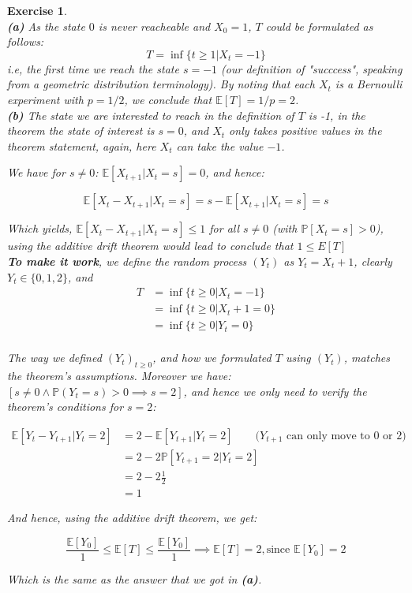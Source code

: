\documentclass{article}
\newtheorem{exo}{Exercise}
\def\P{\mathbb{P}}
\def\E{\mathbb{E}}
\begin{document}
\begin{exo}{\ \\}
\noindent
\textbf{(a)} As the state $0$ is never reacheable and $X_0 = 1$, $T$ could be formulated as follows: \[T = \inf\{t \geq 1 | X_t = -1 \} \] i.e, the first time we reach the state $s = -1$ (our definition of "succcess", speaking from a geometric distribution terminology). By noting that each $X_t$ is a Bernoulli experiment with $p =1/2$, we conclude that $\E[T] = 1/p = 2$. \\

\noindent
\textbf{(b)} The state we are interested to reach in the definition of $T$ is -1, in the theorem the state of interest is $s = 0$, and $X_t$ only takes positive values in the theorem statement, again, here $X_t$ can take the value $-1$.

We have for $s \neq 0$: $\E[X_{t+1}|X_t = s] = 0$, and hence: 

\[ \E[X_t - X_{t+1} | X_t =s] =  s - \E[X_{t+1}|X_t = s] = s \]

Which yields, $\E[X_t - X_{t+1}| X_t = s] \leq 1$ for all $s \neq 0$ (with $\P[X_t =s]> 0$), using the additive drift theorem would lead to conclude that $1 \leq E[T]$ \\

\textbf{To make it work}, we define the random process $(Y_t)$ as $Y_t = X_t +1$, clearly $Y_t \in \{0, 1, 2\}$, and 
\begin{align*}
    T 
    &= \inf\{ t \geq 0 | X_t = -1\} \\
    &= \inf\{ t \geq 0 | X_t+ 1 = 0\} \\
    &= \inf\{ t \geq 0 | Y_t = 0\} \\ 
\end{align*}

The way we defined $(Y_t)_{t\geq0}$, and how we formulated $T$ using $(Y_t)$, matches the theorem's assumptions. Moreover we have:
$[s \neq 0 \land \P(Y_t = s)> 0 \implies s=2]$, and hence we only need to verify the theorem's conditions for $s=2$:

\begin{align*}
    \E[Y_t - Y_{t+1}| Y_t  = 2] 
        &= 2 - \E[Y_{t+1}|Y_t = 2] 
        \quad \quad \text{($Y_{t+1}$ can only move to 0 or 2)}\\
        &= 2 - 2\P[Y_{t+1}=2|Y_t = 2] \\
        &= 2 - 2 \frac{1}{2} \\ 
        &= 1
\end{align*}

And hence, using the additive drift theorem, we get:

\[  \frac{\E[Y_0]}{1} \leq \E[T] \leq \frac{\E[Y_0]}{1} \implies  \E[T] =  2, \text{since $\E[Y_0]=2$} \]

Which is the same as the answer that we got in \textbf{(a)}. 


\end{exo}
\end{document}

